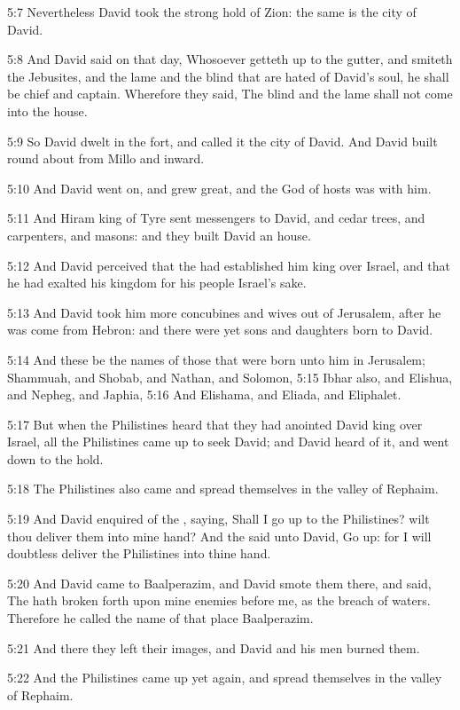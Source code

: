 5:7 Nevertheless David took the strong hold of Zion: the same is the city of David.

5:8 And David said on that day, Whosoever getteth up to the gutter, and smiteth the Jebusites, and the lame and the blind that are hated of David's soul, he shall be chief and captain. Wherefore they said, The blind and the lame shall not come into the house.

5:9 So David dwelt in the fort, and called it the city of David. And David built round about from Millo and inward.

5:10 And David went on, and grew great, and the \LORD God of hosts was with him.

5:11 And Hiram king of Tyre sent messengers to David, and cedar trees, and carpenters, and masons: and they built David an house.

5:12 And David perceived that the \LORD had established him king over Israel, and that he had exalted his kingdom for his people Israel's sake.

5:13 And David took him more concubines and wives out of Jerusalem, after he was come from Hebron: and there were yet sons and daughters born to David.

5:14 And these be the names of those that were born unto him in Jerusalem; Shammuah, and Shobab, and Nathan, and Solomon, 5:15 Ibhar also, and Elishua, and Nepheg, and Japhia, 5:16 And Elishama, and Eliada, and Eliphalet.

5:17 But when the Philistines heard that they had anointed David king over Israel, all the Philistines came up to seek David; and David heard of it, and went down to the hold.

5:18 The Philistines also came and spread themselves in the valley of Rephaim.

5:19 And David enquired of the \LORD, saying, Shall I go up to the Philistines? wilt thou deliver them into mine hand? And the \LORD said unto David, Go up: for I will doubtless deliver the Philistines into thine hand.

5:20 And David came to Baalperazim, and David smote them there, and said, The \LORD hath broken forth upon mine enemies before me, as the breach of waters. Therefore he called the name of that place Baalperazim.

5:21 And there they left their images, and David and his men burned them.

5:22 And the Philistines came up yet again, and spread themselves in the valley of Rephaim.

